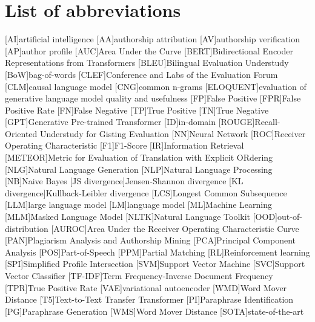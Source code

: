 \chapter*{List of abbreviations}

\begin{acronym}[XXXXXXXXX]
    [AI]{artificial intelligence}
    [AA]{authorship attribution}
    [AV]{authorship verification}
    [AP]{author profile}
    [AUC]{Area Under the Curve}
    [BERT]{Bidirectional Encoder Representations from Transformers}
    [BLEU]{Bilingual Evaluation Understudy}
    [BoW]{bag-of-words}
    [CLEF]{Conference and Labs of the Evaluation Forum}
    [CLM]{causal language model}
    [CNG]{common n-grams}
    [ELOQUENT]{evaluation of generative language model quality and usefulness}
    [FP]{False Positive}
    [FPR]{False Positive Rate}
    [FN]{False Negative}
    [TP]{True Positive}
    [TN]{True Negative}
    [GPT]{Generative Pre-trained Transformer}
    [ID]{in-domain}
    [ROUGE]{Recall-Oriented Understudy for Gisting Evaluation}
    [NN]{Neural Network}
    [ROC]{Receiver Operating Characteristic}
    [F1]{F1-Score}
    [IR]{Information Retrieval}
    [METEOR]{Metric for Evaluation of Translation with Explicit ORdering}
    [NLG]{Natural Language Generation}
    [NLP]{Natural Language Processing}
    [NB]{Naive Bayes}
    [JS divergence]{Jensen-Shannon divergence}
    [KL divergence]{Kullback-Leibler divergence}
    [LCS]{Longest Common Subsequence}
    [LLM]{large language model}
    [LM]{language model}
    [ML]{Machine Learning}
    [MLM]{Masked Language Model}
    [NLTK]{Natural Language Toolkit}
    [OOD]{out-of-distribution}
    [AUROC]{Area Under the Receiver Operating Characteristic Curve}
    [PAN]{Plagiarism Analysis and Authorship Mining} %
    [PCA]{Principal Component Analysis}
    [POS]{Part-of-Speech}
    [PPM]{Partial Matching}
    [RL]{Reinforcement learning}
    [SPI]{Simplified Profile Intersection}
    [SVM]{Support Vector Machine}
    [SVC]{Support Vector Classifier}
    [TF-IDF]{Term Frequency-Inverse Document Frequency}
    [TPR]{True Positive Rate}
    [VAE]{variational autoencoder}
    [WMD]{Word Mover Distance}
    [T5]{Text-to-Text Transfer Transformer}
    [PI]{Paraphrase Identification}
    [PG]{Paraphrase Generation}
    [WMS]{Word Mover Distance}
    [SOTA]{state-of-the-art}

\end{acronym}
